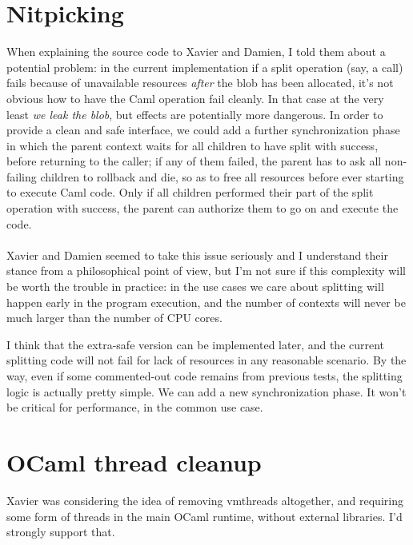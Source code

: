 \documentclass[a4paper,twoside,draft,12pt]{article}
\begin{document}
\section{Nitpicking}
When explaining the source code to Xavier and Damien, I told them
about a potential problem: in the current implementation if a split
operation (say, a  call) fails because of
unavailable resources \textit{after} the blob has been allocated, it's
not obvious how to have the Caml  operation fail cleanly.
In that case at the very least \textit{we leak the blob}, but effects
are potentially more dangerous.  In order to provide a clean and safe
interface, we could add a further synchronization phase in which the
parent context waits for all children to have split with success,
before returning to the caller; if any of them failed, the parent has
to ask all non-failing children to rollback and die, so as to free all
resources before ever starting to execute Caml code.  Only if all
children performed their part of the split operation with success, the
parent can authorize them to go on and execute the code.
\\
\\
Xavier and Damien seemed to take this issue seriously and I understand
their stance from a philosophical point of view, but I'm not sure if
this complexity will be worth the trouble in practice: in the use
cases we care about splitting will happen early in the program
execution, and the number of contexts will never be much larger than
the number of CPU cores.

I think that the extra-safe version can be implemented later, and the
current splitting code will not fail for lack of resources in any
reasonable scenario.
By the way, even if some commented-out code remains from previous
tests, the splitting logic is actually pretty simple.  We can add a
new synchronization phase.  It won't be critical for performance, in
the common use case.


\FILL

\section{OCaml thread cleanup}
Xavier was considering the idea of removing vmthreads altogether, and
requiring some form of threads in the main OCaml runtime, without
external libraries.  I'd strongly support that.
\end{document}

